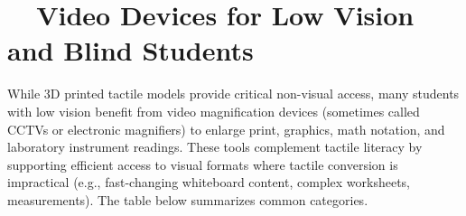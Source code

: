 \section{~~Video  Devices for Low Vision and Blind Students}\label{ch5:sec:video-magnifiers}
While 3D printed tactile models provide critical non-visual access, many students with low vision benefit from video magnification devices (sometimes called CCTVs or electronic magnifiers) to enlarge print, graphics, math notation, and laboratory instrument readings. These tools complement tactile literacy by supporting efficient access to visual formats where tactile conversion is impractical (e.g., fast-changing whiteboard content, complex worksheets, measurements). The table below summarizes common categories.\supercite{PerkinsVideoMagnifier, Legge1985ReadingII, Legge1987ReadingIII}


